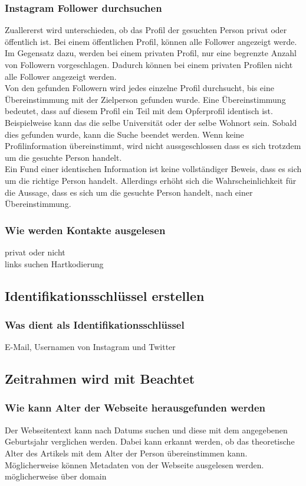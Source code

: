 		\subsubsection{Instagram Follower durchsuchen} 
		Zuallererst wird unterschieden, ob das Profil der gesuchten Person privat oder öffentlich ist. Bei einem öffentlichen Profil, können alle Follower angezeigt werde. Im Gegensatz dazu, werden bei einem privaten Profil, nur eine begrenzte Anzahl von Followern vorgeschlagen. Dadurch können bei einem privaten Profilen nicht alle Follower angezeigt werden.\\
		Von den gefunden Followern wird jedes einzelne Profil durchsucht, bis eine Übereinstimmung mit der Zielperson gefunden wurde. Eine Übereinstimmung bedeutet, dass auf diesem Profil ein Teil mit dem Opferprofil identisch ist. Beispielweise kann das die selbe Universität oder der selbe Wohnort sein. Sobald dies gefunden wurde, kann die Suche beendet werden. Wenn keine Profilinformation übereinstimmt, wird nicht aussgeschlossen dass es sich trotzdem um die gesuchte Person handelt.\\
		Ein Fund einer identischen Information ist keine vollständiger Beweis, dass es sich um die richtige Person handelt. Allerdings erhöht sich die Wahrscheinlichkeit für die Aussage, dass es sich um die gesuchte Person handelt, nach einer Übereinstimmung.
		
		\subsubsection{Wie werden Kontakte ausgelesen}
		privat oder nicht\\
		links suchen
		Hartkodierung
	\subsection{Identifikationsschlüssel erstellen}
		\subsubsection{Was dient als Identifikationsschlüssel}
		E-Mail, Usernamen von Instagram und Twitter
	\subsection{Zeitrahmen wird mit Beachtet}
		\subsubsection{Wie kann Alter der Webseite herausgefunden werden}
		Der Webseitentext kann nach Datums suchen und diese mit dem angegebenen Geburtsjahr verglichen werden. Dabei kann erkannt werden, ob das theoretische Alter des Artikels mit dem Alter der Person übereinstimmen kann. Möglicherweise können Metadaten von der Webseite ausgelesen werden.
		möglicherweise über domain
